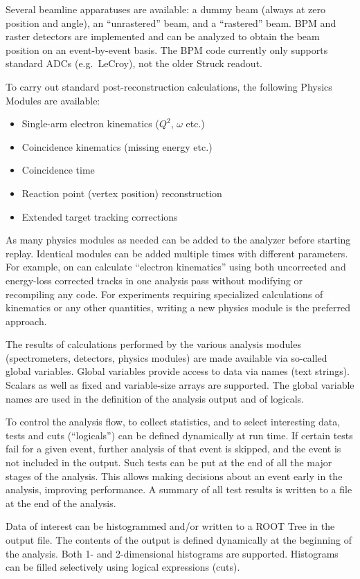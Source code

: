 {Several beamline apparatuses are available: a dummy beam (always at zero 
position and angle), an ``unrastered'' beam, and a ``rastered'' beam. 
BPM and raster detectors are implemented and 
can be analyzed to obtain the beam position
on an event-by-event basis.  The BPM code currently only supports
standard ADCs (e.g.\ LeCroy), not the older Struck readout.

To carry out standard post-reconstruction calculations, the following
Physics Modules are available:
\begin{itemize} \setlength{\parskip}{0ex}
  \item Single-arm electron kinematics ($Q^2$, $\omega$ etc.)
  \item Coincidence kinematics (missing energy etc.)
  \item Coincidence time
  \item Reaction point (vertex position) reconstruction 
  \item Extended target tracking corrections
\end{itemize}
As many physics
modules as needed can be added to the analyzer before starting replay.
Identical modules can be added multiple times with different parameters.
For example, on can calculate ``electron kinematics'' using both uncorrected
and energy-loss corrected tracks in one analysis pass without modifying
or recompiling any code. For experiments requiring
specialized calculations of kinematics or any other quantities,
writing a new physics module is the preferred approach. 

The results of calculations performed by the various analysis modules 
(spectrometers, detectors, physics modules) are made available via 
so-called global variables. 
Global variables provide access to data via names (text strings). 
Scalars as well as fixed and variable-size arrays are supported.
The global variable names are used in the definition of the analysis output
and of logicals. 

To control the analysis flow, to collect statistics, and to select
interesting data, tests and cuts (``logicals'') can be defined
dynamically at run time.  If certain tests fail for a given event,
further analysis of that event is skipped, and the event is not
included in the output.  Such tests can be put at the end of all the
major stages of the analysis.  This allows making decisions about an
event early in the analysis, improving performance.  A summary of all
test results is written to a file at the end of the analysis.

Data of interest can be histogrammed and/or written to
a ROOT Tree in the output file.  The contents of the output
is defined dynamically at the beginning of the analysis.
Both 1- and 2-dimensional histograms are supported. Histograms
can be filled selectively using logical expressions (cuts).

} %

